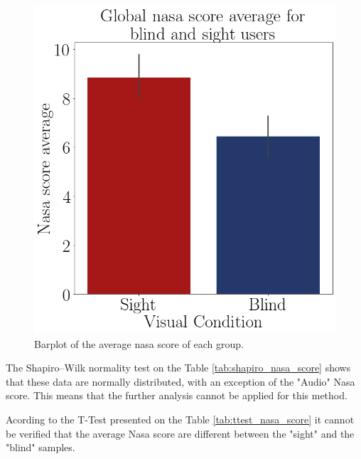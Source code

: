 \begin{figure}[!htb]
\begin{minipage}{.45\linewidth}
        \includegraphics[width = \linewidth]{Resultados/Nasa/Figuras/png/barplot_nasa_avg_global.png}
        \caption{Barplot of the average nasa score of each group.}
        \label{fig:barplot_nasa_global}
    \end{minipage}
\end{figure}

The Shapiro–Wilk normality test on the Table \ref{tab:shapiro_nasa_score} shows that these data are normally distributed, with an exception of the "Audio" Nasa score. This means that the further analysis cannot be applied for this method.

%

Acording to the T-Test presented on the Table \ref{tab:ttest_nasa_score} it cannot be verified that the average Nasa score are different between the "sight" and the "blind" samples.

%

\begin{table}[!htb]
    \begin{minipage}{.45\linewidth}
        
    \end{minipage}
    \hfill
    \begin{minipage}{.45\linewidth}
        \vspace{-2.75cm}
        
    \end{minipage}
\end{table}


